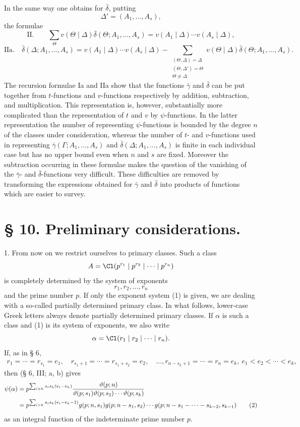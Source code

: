 In the same way one obtains for $\bar\delta$, putting
\[
 \Delta'=(A_1,\ldots,A_s),
\]
the formulae
\[
\text{II.}\qquad
 \sum_{\Theta}v(\Theta\mid\Delta)\bar\delta(\Theta;A_1,\ldots,A_s)
 =v(A_1\mid\Delta)\cdots v(A_s\mid\Delta),
\]
\[
\text{IIa.}\quad
 \bar\delta(\Delta;A_1,\ldots,A_s)=v(A_1\mid\Delta)\cdots v(A_s\mid\Delta)
 -\sum_{\substack{(\Theta,\Delta)=\Delta\\(\Theta,\Delta')=\Theta\\\Theta\ne\Delta}}
 v(\Theta\mid\Delta)\bar\delta(\Theta;A_1,\ldots,A_s).
\]
The recursion formulae Ia and IIa show that the functions $\bar\gamma$ and $\bar\delta$ can be put together from $t$-functions and $v$-functions respectively by addition, subtraction, and multiplication. This representation is, however, substantially more complicated than the representation of $t$ and $v$ by $\psi$-functions. In the latter representation the number of representing $\psi$-functions is bounded by the degree $n$ of the classes under consideration, whereas the number of $t$- and $v$-functions used in representing $\bar\gamma(\Gamma;A_1,\ldots,A_s)$ and $\bar\delta(\Delta;A_1,\ldots,A_s)$ is finite in each individual case but has no upper bound even when $n$ and $s$ are fixed. Moreover the subtraction occurring in these formulae makes the question of the vanishing of the $\bar\gamma$- and $\bar\delta$-functions very difficult. These difficulties are removed by transforming the expressions obtained for $\bar\gamma$ and $\bar\delta$ into products of functions which are easier to survey.

\section*{§ 10. Preliminary considerations.}

1. From now on we restrict ourselves to primary classes. Such a class
\[
 A=\Cl(p^{r_1}\mid p^{r_2}\mid\cdots\mid p^{r_n})
\]
is completely determined by the system of exponents
\begin{equation}
 r_1,r_2,\ldots,r_n
\tag{1}
\end{equation}
and the prime number $p$. If only the exponent system (1) is given, we are dealing with a so-called partially determined primary class. In what follows, lower-case Greek letters always denote partially determined primary classes. If $\alpha$ is such a class and (1) is its system of exponents, we also write
\[
 \alpha=\Cl(r_1\mid r_2\mid\cdots\mid r_n).
\]
If, as in § 6,
\[
\begin{gathered}
 r_1=\cdots=r_{s_1}=e_1,
 \quad r_{s_1+1}=\cdots=r_{s_1+s_2}=e_2,
 \quad \ldots,
 r_{n-s_k+1}=\cdots=r_n=e_k,\
 e_1<e_2<\cdots<e_k,
\end{gathered}
\]
then (§ 6, III; a, b) gives
\begin{align}
\psi(\alpha)
&=p^{\sum_{i>h}s_i s_h(e_i-e_h)}
 {\vartheta(p;n)\over \vartheta(p;s_1)\vartheta(p;s_2)\cdots\vartheta(p;s_k)} \notag\\
&=p^{\sum_{i>h}s_i s_h(e_i-e_h-1)}
 g(p;n,s_1)g(p;n-s_1,s_2)\cdots
 g(p;n-s_1-\cdots-s_{k-2},s_{k-1})
\tag{2}
\end{align}
as an integral function of the indeterminate prime number $p$.

